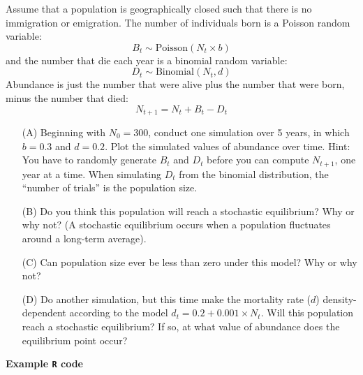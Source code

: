 \documentclass[12pt]{article}\usepackage[]{graphicx}\usepackage[]{xcolor}
\begin{document}
Assume that a population is geographically closed such that there is
no immigration or emigration. The number of individuals born is a
Poisson random variable:
\[
  B_t \sim \mathrm{Poisson}(N_t \times b)
\]
and the number that die each year is a binomial random variable:
\[
  D_t \sim \mathrm{Binomial}(N_t, d)
\]
Abundance is just the number that were alive plus the number that were
born, minus the number that died:
\[
  N_{t+1} = N_t + B_t - D_t
\]
\begin{enumerate}
  \item[(A)] Beginning with $N_0=300$, conduct one simulation over 5
    years, in which $b=0.3$ and $d=0.2$. Plot the simulated values of
    abundance over time. Hint: You have  to randomly generate $B_t$
    and $D_t$ before you can compute  $N_{t+1}$, one year at a
    time. When simulating $D_t$ from the binomial distribution, the
    ``number of trials'' is the population size. 
  \item[(B)] Do you think this population will reach a stochastic
    equilibrium? Why or why not? (A stochastic equilibrium occurs when
    a population fluctuates around a long-term average).
  \item[(C)] Can population size ever be less than zero under this model?
    Why or why not?
  \item[(D)] Do another simulation, but this time make the mortality rate
    ($d$) density-dependent according to the model $d_t = 0.2 +
    0.001\times N_t$. Will this population reach a stochastic equilibrium? If
    so, at what value of abundance does the equilibrium point occur?
\end{enumerate}


\newpage

{\bf Example {\tt R} code \\}


\end{document}
